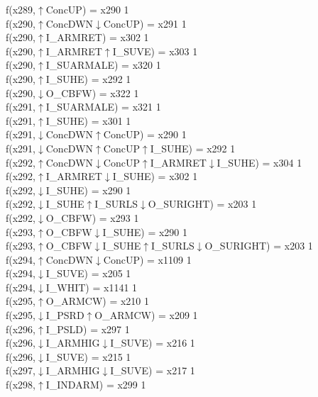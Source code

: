 f(x289,$\uparrow$ConcUP) = x290 {1} \\
f(x290,$\uparrow$ConcDWN$\downarrow$ConcUP) = x291 {1} \\
f(x290,$\uparrow$I\_ARMRET) = x302 {1} \\
f(x290,$\uparrow$I\_ARMRET$\uparrow$I\_SUVE) = x303 {1} \\
f(x290,$\uparrow$I\_SUARMALE) = x320 {1} \\
f(x290,$\uparrow$I\_SUHE) = x292 {1} \\
f(x290,$\downarrow$O\_CBFW) = x322 {1} \\
f(x291,$\uparrow$I\_SUARMALE) = x321 {1} \\
f(x291,$\uparrow$I\_SUHE) = x301 {1} \\
f(x291,$\downarrow$ConcDWN$\uparrow$ConcUP) = x290 {1} \\
f(x291,$\downarrow$ConcDWN$\uparrow$ConcUP$\uparrow$I\_SUHE) = x292 {1} \\
f(x292,$\uparrow$ConcDWN$\downarrow$ConcUP$\uparrow$I\_ARMRET$\downarrow$I\_SUHE) = x304 {1} \\
f(x292,$\uparrow$I\_ARMRET$\downarrow$I\_SUHE) = x302 {1} \\
f(x292,$\downarrow$I\_SUHE) = x290 {1} \\
f(x292,$\downarrow$I\_SUHE$\uparrow$I\_SURLS$\downarrow$O\_SURIGHT) = x203 {1} \\
f(x292,$\downarrow$O\_CBFW) = x293 {1} \\
f(x293,$\uparrow$O\_CBFW$\downarrow$I\_SUHE) = x290 {1} \\
f(x293,$\uparrow$O\_CBFW$\downarrow$I\_SUHE$\uparrow$I\_SURLS$\downarrow$O\_SURIGHT) = x203 {1} \\
f(x294,$\uparrow$ConcDWN$\downarrow$ConcUP) = x1109 {1} \\
f(x294,$\downarrow$I\_SUVE) = x205 {1} \\
f(x294,$\downarrow$I\_WHIT) = x1141 {1} \\
f(x295,$\uparrow$O\_ARMCW) = x210 {1} \\
f(x295,$\downarrow$I\_PSRD$\uparrow$O\_ARMCW) = x209 {1} \\
f(x296,$\uparrow$I\_PSLD) = x297 {1} \\
f(x296,$\downarrow$I\_ARMHIG$\downarrow$I\_SUVE) = x216 {1} \\
f(x296,$\downarrow$I\_SUVE) = x215 {1} \\
f(x297,$\downarrow$I\_ARMHIG$\downarrow$I\_SUVE) = x217 {1} \\
f(x298,$\uparrow$I\_INDARM) = x299 {1} \\
